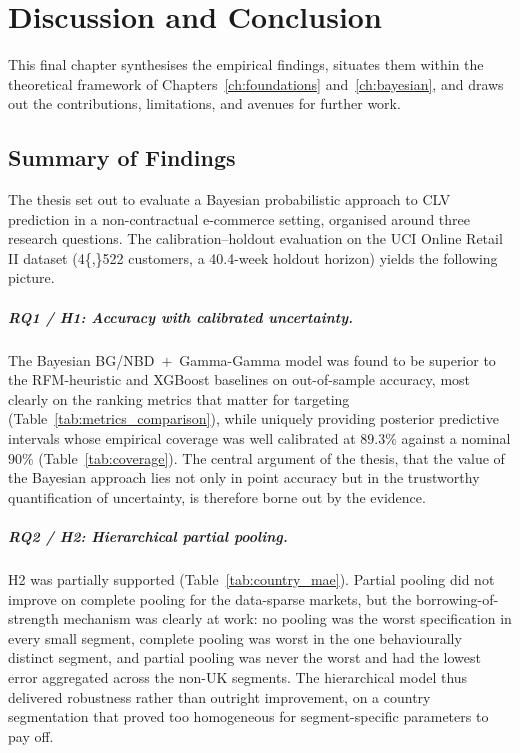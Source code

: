 \chapter{Discussion and Conclusion}
\label{ch:conclusion}

This final chapter synthesises the empirical findings, situates them within the theoretical framework of Chapters~\ref{ch:foundations} and~\ref{ch:bayesian}, and draws out the contributions, limitations, and avenues for further work.

\section{Summary of Findings}
\label{sec:findings}

The thesis set out to evaluate a Bayesian probabilistic approach to CLV prediction in a non-contractual e-commerce setting, organised around three research questions. The calibration--holdout evaluation on the UCI Online Retail II dataset (\num{4{,}522} customers, a \num{40.4}-week holdout horizon) yields the following picture.

\paragraph{RQ1 / H1: Accuracy with calibrated uncertainty.}
The Bayesian BG/NBD~$+$~Gamma-Gamma model was found to be superior to the RFM-heuristic and XGBoost baselines on out-of-sample accuracy, most clearly on the ranking metrics that matter for targeting (Table~\ref{tab:metrics_comparison}), while uniquely providing posterior predictive intervals whose empirical coverage was well calibrated at $89.3\%$ against a nominal $90\%$ (Table~\ref{tab:coverage}). The central argument of the thesis, that the value of the Bayesian approach lies not only in point accuracy but in the trustworthy quantification of uncertainty, is therefore borne out by the evidence.

\paragraph{RQ2 / H2: Hierarchical partial pooling.}
H2 was partially supported (Table~\ref{tab:country_mae}). Partial pooling did not improve on complete pooling for the data-sparse markets, but the borrowing-of-strength mechanism was clearly at work: no pooling was the worst specification in every small segment, complete pooling was worst in the one behaviourally distinct segment, and partial pooling was never the worst and had the lowest error aggregated across the non-UK segments. The hierarchical model thus delivered robustness rather than outright improvement, on a country segmentation that proved too homogeneous for segment-specific parameters to pay off.

